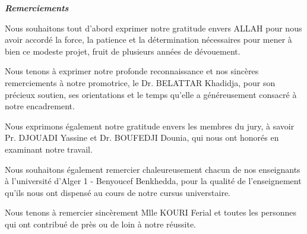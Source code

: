 \begin{center}
\textbf{\Large{\emph{Remerciements}}}\\
\end{center}

\par
Nous souhaitons tout d'abord exprimer notre gratitude envers ALLAH pour nous avoir accordé la force, la patience et la détermination nécessaires pour mener à bien ce modeste projet, fruit de plusieurs années de dévouement.

\par
Nous tenons à exprimer notre profonde reconnaissance et nos sincères remerciements à notre promotrice, le Dr. BELATTAR Khadidja, pour son précieux soutien, ses orientations et le temps qu'elle a généreusement consacré à notre encadrement.

\par
Nous exprimons également notre gratitude envers les membres du jury, à savoir Pr. DJOUADI Yassine et Dr. BOUFEDJI Dounia, qui nous ont honorés en examinant notre travail.

\par
Nous souhaitons également remercier chaleureusement chacun de nos enseignants à l'université d'Alger 1 - Benyoucef Benkhedda, pour la qualité de l'enseignement qu'ils nous ont dispensé au cours de notre cursus universtaire.

\par
Nous tenons à remercier sincèrement Mlle KOURI Ferial  et toutes les personnes qui ont contribué de près ou de loin à notre réussite.
\\
